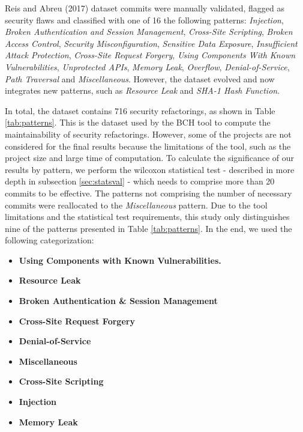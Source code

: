 \documentclass[10pt,conference]{IEEEtran}
\begin{document}
Reis and Abreu (2017) dataset commits were manually validated, flagged as security flaws and classified with one of 16 the following patterns: \textit{Injection}, \textit{Broken Authentication and Session Management}, \textit{Cross-Site Scripting}, \textit{Broken Access Control}, \textit{Security Misconfiguration}, \textit{Sensitive Data Exposure}, \textit{Insufficient Attack Protection}, \textit{Cross-Site Request Forgery}, \textit{Using Components With Known Vulnerabilities}, \textit{Unprotected APIs}, \textit{Memory Leak}, \textit{Overflow}, \textit{Denial-of-Service}, \textit{Path Traversal} and \textit{Miscellaneous}. However, the dataset evolved and now integrates new patterns, such as \textit{Resource Leak} and \textit{SHA-1 Hash Function}.

In total, the dataset contains 716 security refactorings, as shown in Table \ref{tab:patterns}. This is the dataset used
by the BCH tool to compute the maintainability of security refactorings. However, some of the projects are not considered for
the final results because the limitations of the tool, such as the project size and large time of computation. To calculate the significance of our results by pattern, we perform the wilcoxon statistical test - described in more depth in subsection \ref{sec:statsval} - which needs to comprise more than 20 commits to be effective. The patterns not comprising the number of necessary commits were reallocated to the \textit{Miscellaneous} pattern. Due to the tool limitations and the statistical test requirements, this study only distinguishes nine of the patterns presented in Table \ref{tab:patterns}. In the
end, we used the following categorization:

\begin{itemize}
	\item \textbf{Using Components with Known Vulnerabilities.}
	\item \textbf{Resource Leak}
	\item \textbf{Broken Authentication \& Session Management}
	\item \textbf{Cross-Site Request Forgery}
	\item \textbf{Denial-of-Service}
	\item \textbf{Miscellaneous}
	\item \textbf{Cross-Site Scripting}
	\item \textbf{Injection}
	\item \textbf{Memory Leak}
\end{itemize}
\end{document}
